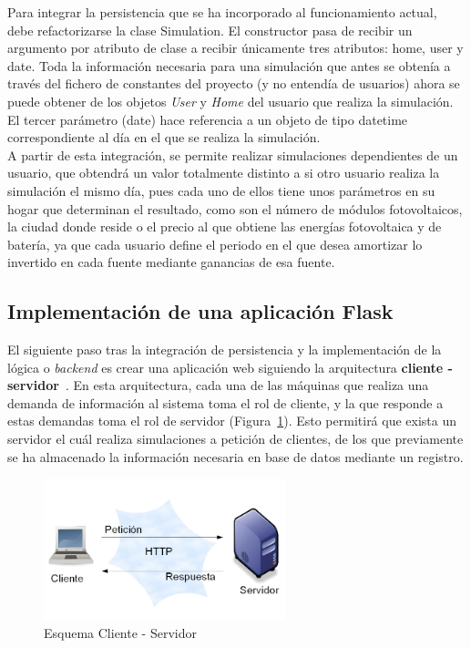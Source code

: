 Para integrar la persistencia que se ha incorporado al funcionamiento actual, debe refactorizarse la clase Simulation. El constructor pasa de recibir un argumento por atributo de clase a recibir únicamente tres atributos: home, user y date. Toda la información necesaria para una simulación que antes se obtenía a través del fichero de constantes del proyecto (y no entendía de usuarios) ahora se puede obtener de los objetos \textit{User} y \textit{Home} del usuario que realiza la simulación. El tercer parámetro (date) hace referencia a un objeto de tipo datetime correspondiente al día en el que se realiza la simulación.\\

A partir de esta integración, se permite realizar simulaciones dependientes de un usuario, que obtendrá un valor totalmente distinto a si otro usuario realiza la simulación el mismo día, pues cada uno de ellos tiene unos parámetros en su hogar que determinan el resultado, como son el número de módulos fotovoltaicos, la ciudad donde reside o el precio al que obtiene las energías fotovoltaica y de batería, ya que cada usuario define el periodo en el que desea amortizar lo invertido en cada fuente mediante ganancias de esa fuente.

\subsection{Implementación de una aplicación Flask}
El siguiente paso tras la integración de persistencia y la implementación de la lógica o \textit{backend} es crear una aplicación web siguiendo la arquitectura \textbf{cliente - servidor}~\cite{Goer04}. En esta arquitectura, cada una de las máquinas que realiza una demanda de información al sistema toma el rol de cliente, y la que responde a estas demandas toma el rol de servidor (Figura~\ref{fig:client-server}). Esto permitirá que exista un servidor el cuál realiza simulaciones a petición de clientes, de los que previamente se ha almacenado la información necesaria en base de datos mediante un registro.
\begin{figure}[!h]
            \centering
            \includegraphics[width=7cm]{figs/client-server.png}
            \caption{Esquema Cliente - Servidor}
            \label{fig:client-server}
\end{figure}


